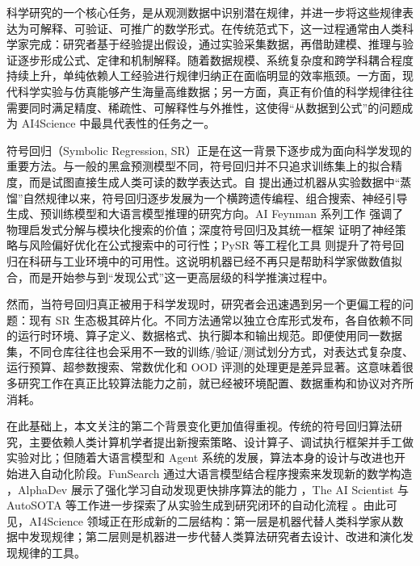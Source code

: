 \documentclass[UTF8,12pt]{ctexart}
\begin{document}
科学研究的一个核心任务，是从观测数据中识别潜在规律，并进一步将这些规律表达为可解释、可验证、可推广的数学形式。在传统范式下，这一过程通常由人类科学家完成：研究者基于经验提出假设，通过实验采集数据，再借助建模、推理与验证逐步形成公式、定律和机制解释。随着数据规模、系统复杂度和跨学科耦合程度持续上升，单纯依赖人工经验进行规律归纳正在面临明显的效率瓶颈。一方面，现代科学实验与仿真能够产生海量高维数据；另一方面，真正有价值的科学规律往往需要同时满足精度、稀疏性、可解释性与外推性，这使得“从数据到公式”的问题成为 AI4Science 中最具代表性的任务之一。

符号回归（Symbolic Regression, SR）正是在这一背景下逐步成为面向科学发现的重要方法。与一般的黑盒预测模型不同，符号回归并不只追求训练集上的拟合精度，而是试图直接生成人类可读的数学表达式。自 \citet{schmidt2009distilling} 提出通过机器从实验数据中“蒸馏”自然规律以来，符号回归逐步发展为一个横跨遗传编程、组合搜索、神经引导生成、预训练模型和大语言模型推理的研究方向。AI Feynman 系列工作 \citep{udrescu2020aifeynman,udrescu2020aifeynman2} 强调了物理启发式分解与模块化搜索的价值；深度符号回归及其统一框架 \citep{petersen2021deep,landajuela2022udsr} 证明了神经策略与风险偏好优化在公式搜索中的可行性；PySR 等工程化工具 \citep{cranmer2023pysr} 则提升了符号回归在科研与工业环境中的可用性。这说明机器已经不再只是帮助科学家做数值拟合，而是开始参与到“发现公式”这一更高层级的科学推演过程中。

然而，当符号回归真正被用于科学发现时，研究者会迅速遇到另一个更偏工程的问题：现有 SR 生态极其碎片化。不同方法通常以独立仓库形式发布，各自依赖不同的运行时环境、算子定义、数据格式、执行脚本和输出规范。即便使用同一数据集，不同仓库往往也会采用不一致的训练/验证/测试划分方式，对表达式复杂度、运行预算、超参数搜索、常数优化和 OOD 评测的处理更是差异显著。这意味着很多研究工作在真正比较算法能力之前，就已经被环境配置、数据重构和协议对齐所消耗。

在此基础上，本文关注的第二个背景变化更加值得重视。传统的符号回归算法研究，主要依赖人类计算机学者提出新搜索策略、设计算子、调试执行框架并手工做实验对比；但随着大语言模型和 Agent 系统的发展，算法本身的设计与改进也开始进入自动化阶段。FunSearch 通过大语言模型结合程序搜索来发现新的数学构造 \citep{romeraparedes2024funsearch}，AlphaDev 展示了强化学习自动发现更快排序算法的能力 \citep{mankowitz2023alphadev}，The AI Scientist 与 AutoSOTA 等工作进一步探索了从实验生成到研究闭环的自动化流程 \citep{lu2024aiscientist,li2026autosota}。由此可见，AI4Science 领域正在形成新的二层结构：第一层是机器代替人类科学家从数据中发现规律；第二层则是机器进一步代替人类算法研究者去设计、改进和演化发现规律的工具。
\end{document}
